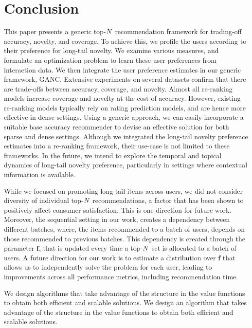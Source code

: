 \section{Conclusion}
\label{sec:conclusion}
This paper presents a generic top-$N$ recommendation framework for  trading-off accuracy, novelty, and coverage. To achieve this, we profile the users according to their preference for long-tail novelty. We examine various measures, and formulate an optimization problem to learn these user preferences from interaction data.  We then integrate the user preference estimates in our generic framework, GANC.  Extensive experiments on several datasets confirm that there are trade-offs between accuracy, coverage, and novelty. Almost all re-ranking models increase coverage and novelty at the cost of accuracy. However, existing re-ranking models typically rely on rating prediction models, and are hence more effective in dense settings. Using a generic approach, we can easily incorporate a suitable base accuracy recommender to devise an effective solution for both sparse and dense settings.  %
Although we integrated the  long-tail novelty preference estimates into a re-ranking framework, their use-case is not limited to these frameworks. In  the future, we intend to explore the temporal and topical dynamics of long-tail novelty preference, particularly in settings where contextual information is  available.  


\iffalse
While we focused on promoting long-tail items across users, we did not consider diversity of individual top-$N$ recommendations, a factor that has been shown to positively affect consumer satisfaction. This is one direction for future work. Moreover, the sequential setting  in our work, creates a dependency between different batches, where,  the items recommended to a batch of users, depends on those recommended to previous batches. This dependency is created through the parameter $\mathbf{f}$, that is updated every time a top-$N$ set  is allocated to a batch of users. A future direction for our work is to estimate a distribution over $\mathbf{f}$ that allows us to independently solve the problem for each user, leading to improvements across all performance metrics, including recommendation time. 

We design algorithms that take advantage of the structure in the value functions to obtain both efficient and scalable solutions. 
We design an algorithm that takes advantage of the structure in the value functions to obtain both efficient and scalable solutions. 

